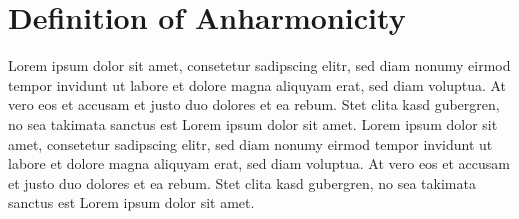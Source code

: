 \section{Definition of Anharmonicity}

Lorem ipsum dolor sit amet, consetetur sadipscing elitr, sed diam nonumy eirmod tempor invidunt ut labore et dolore magna aliquyam erat, sed diam voluptua. At vero eos et accusam et justo duo dolores et ea rebum. Stet clita kasd gubergren, no sea takimata sanctus est Lorem ipsum dolor sit amet. Lorem ipsum dolor sit amet, consetetur sadipscing elitr, sed diam nonumy eirmod tempor invidunt ut labore et dolore magna aliquyam erat, sed diam voluptua. At vero eos et accusam et justo duo dolores et ea rebum. Stet clita kasd gubergren, no sea takimata sanctus est Lorem ipsum dolor sit amet.


